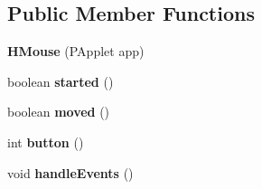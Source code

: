\subsection*{Public Member Functions}
\begin{DoxyCompactItemize}
\item 
\hypertarget{classhype_1_1core_1_1util_1_1_h_mouse_ad318ee3dc2c4b5950ab7953acb4a1ef7}{{\bfseries H\-Mouse} (P\-Applet app)}\label{classhype_1_1core_1_1util_1_1_h_mouse_ad318ee3dc2c4b5950ab7953acb4a1ef7}

\item 
\hypertarget{classhype_1_1core_1_1util_1_1_h_mouse_aec9dac357942173cab93b58956212681}{boolean {\bfseries started} ()}\label{classhype_1_1core_1_1util_1_1_h_mouse_aec9dac357942173cab93b58956212681}

\item 
\hypertarget{classhype_1_1core_1_1util_1_1_h_mouse_acacc5b5a6b08d5693e836c3f8792cc2c}{boolean {\bfseries moved} ()}\label{classhype_1_1core_1_1util_1_1_h_mouse_acacc5b5a6b08d5693e836c3f8792cc2c}

\item 
\hypertarget{classhype_1_1core_1_1util_1_1_h_mouse_ab3e6d914077de941d2e67566885ad9c9}{int {\bfseries button} ()}\label{classhype_1_1core_1_1util_1_1_h_mouse_ab3e6d914077de941d2e67566885ad9c9}

\item 
\hypertarget{classhype_1_1core_1_1util_1_1_h_mouse_ad46d4701b55352ac6e9280148a9399f0}{void {\bfseries handle\-Events} ()}\label{classhype_1_1core_1_1util_1_1_h_mouse_ad46d4701b55352ac6e9280148a9399f0}


\end{DoxyCompactItemize}
